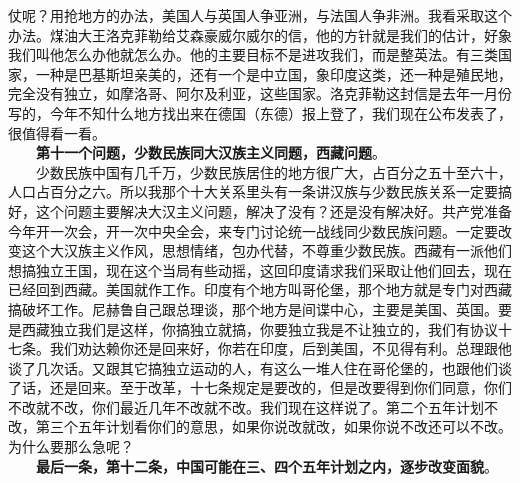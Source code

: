 \documentclass[cn,11pt,chinese]{elegantbook}
\begin{document}
仗呢？用抢地方的办法，美国人与英国人争亚洲，与法国人争非洲。我看采取这个办法。煤油大王洛克菲勒给艾森豪威尔威尔的信，他的方针就是我们的估计，好象我们叫他怎么办他就怎么办。他的主要目标不是进攻我们，而是整英法。有三类国家，一种是巴基斯坦亲美的，还有一个是中立国，象印度这类，还一种是殖民地，完全没有独立，如摩洛哥、阿尔及利亚，这些国家。洛克菲勒这封信是去年一月份写的，今年不知什么地方找出来在德国（东德）报上登了，我们现在公布发表了，很值得看一看。\\
　　\textbf{第十一个问题，少数民族同大汉族主义同题，西藏问题}。\\
　　少数民族中国有几千万，少数民族居住的地方很广大，占百分之五十至六十，人口占百分之六。所以我那个十大关系里头有一条讲汉族与少数民族关系一定要搞好，这个问题主要解决大汉主义问题，解决了没有？还是没有解决好。共产党准备今年开一次会，开一次中央全会，来专门讨论统一战线同少数民族问题。一定要改变这个大汉族主义作风，思想情绪，包办代替，不尊重少数民族。西藏有一派他们想搞独立王国，现在这个当局有些动摇，这回印度请求我们采取让他们回去，现在已经回到西藏。美国就作工作。印度有个地方叫哥伦堡，那个地方就是专门对西藏搞破坏工作。尼赫鲁自己跟总理谈，那个地方是间谍中心，主要是美国、英国。要是西藏独立我们是这样，你搞独立就搞，你要独立我是不让独立的，我们有协议十七条。我们劝达赖你还是回来好，你若在印度，后到美国，不见得有利。总理跟他谈了几次话。又跟其它搞独立运动的人，有这么一堆人住在哥伦堡的，也跟他们谈了话，还是回来。至于改革，十七条规定是要改的，但是改要得到你们同意，你们不改就不改，你们最近几年不改就不改。我们现在这样说了。第二个五年计划不改，第三个五年计划看你们的意思，如果你说改就改，如果你说不改还可以不改。为什么要那么急呢？\\
　　\textbf{最后一条，第十二条，中国可能在三、四个五年计划之内，逐步改变面貌}。\\
\end{document}
